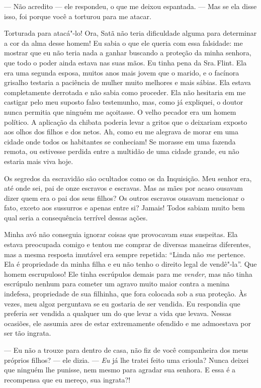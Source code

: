 --- Não acredito --- ele respondeu, o que me deixou espantada. --- Mas
se ela disse isso, foi porque você a torturou para me atacar.

Torturada para atacá"-lo! Ora, Satã não teria dificuldade alguma para
determinar a cor da alma desse homem! Eu sabia o que ele queria com essa
falsidade: me mostrar que eu não teria nada a ganhar buscando a proteção
da minha senhora, que todo o poder ainda estava nas suas mãos. Eu tinha
pena da Sra.\,Flint. Ela era uma segunda esposa, muitos anos mais jovem
que o marido, e o facínora grisalho testaria a paciência de mulher muito
melhores e mais sábias. Ela estava completamente derrotada e não sabia
como proceder. Ela não hesitaria em me castigar pelo meu suposto falso
testemunho, mas, como já expliquei, o doutor nunca permitia que ninguém
me açoitasse. O velho pecador era um homem político. A aplicação da
chibata poderia levar a gritos que o deixariam exposto aos olhos dos
filhos e dos netos. Ah, como eu me alegrava de morar em uma cidade onde
todos os habitantes se conheciam! Se morasse em uma fazenda remota, ou
estivesse perdida entre a multidão de uma cidade grande, eu não estaria
mais viva hoje.

Os segredos da escravidão são ocultados
como os da Inquisição. Meu senhor era, até onde sei, pai de onze
escravos e escravas. Mas as mães por acaso ousavam dizer quem era o pai
dos seus filhos? Os outros escravos ousavam mencionar o fato, exceto aos
sussurros e apenas entre si? Jamais! Todos sabiam muito bem qual seria a
consequência terrível dessas ações.

Minha avó não conseguia ignorar coisas
que provocavam suas suspeitas. Ela estava preocupada comigo e tentou me
comprar de diversas maneiras diferentes, mas a mesma resposta imutável
era sempre repetida: ``Linda não \emph{me} pertence. Ela é propriedade
da minha filha e eu não tenho o direito legal de vendê"-la''. Que homem
escrupuloso! Ele tinha escrúpulos demais para me \emph{vender}, mas não
tinha escrúpulo nenhum para cometer um agravo muito maior contra a
menina indefesa, propriedade de sua filhinha, que fora colocada sob a
sua proteção. Às vezes, meu algoz perguntava se eu gostaria de ser
vendida. Eu respondia que preferia ser vendida a qualquer um do que
levar a vida que levava. Nessas ocasiões, ele assumia ares de estar
extremamente ofendido e me admoestava por ser tão ingrata.

--- Eu não a trouxe para dentro de casa, não fiz de você companheira dos
meus próprios filhos? --- ele dizia. --- \emph{Eu} já lhe tratei feito
uma crioula? Nunca deixei que ninguém lhe punisse, nem mesmo para
agradar sua senhora. E essa é a recompensa que eu mereço, sua ingrata?!

